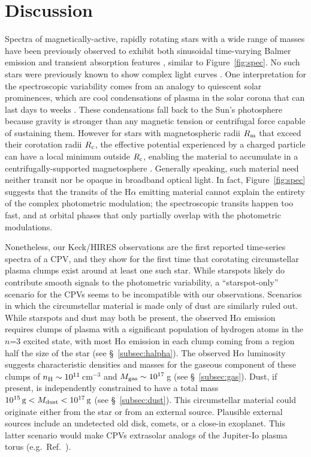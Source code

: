 \documentclass{nature3}
\begin{document}
\section{Discussion}

Spectra of magnetically-active, rapidly rotating stars with a wide
range of masses have been previously observed to exhibit both
sinusoidal time-varying Balmer emission
\cite{Donati2000,Townsend2005,Dunstone2006,Skelly2008} and transient
absorption features
\cite{CollierCameron1989,CollierCameron1992,Cang2020}, similar to
Figure~\ref{fig:spec}.  No such stars were previously known to show
complex light curves \cite{Bouma2024}.   One interpretation for the
spectroscopic variability comes from an analogy to quiescent solar
prominences, which are cool condensations of plasma in the solar
corona that can last days to weeks \cite{VialEngvold2015}.  These
condensations fall back to the Sun's photosphere because gravity is
stronger than any magnetic tension or centrifugal force capable of
sustaining them.  However for stars with magnetospheric radii $R_{\rm
m}$ that exceed their corotation radii $R_{\rm c}$, the effective
potential experienced by a charged particle can have a local minimum
outside $R_{\rm c}$, enabling the material to accumulate in a
centrifugally-supported magnetosphere
\cite{Petit2013,Daley-Yates2024}.  Generally speaking, such material
need neither transit nor be opaque in broadband optical light.  In
fact, Figure~\ref{fig:spec} suggests that the transits of the
H$\alpha$ emitting material cannot explain the entirety of the complex
photometric modulation;  the spectroscopic transits happen too fast,
and at orbital phases that only partially overlap with the photometric
modulations.

Nonetheless, our Keck/HIRES observations are the first reported
time-series spectra of a CPV, and they show for the first time that
corotating circumstellar plasma clumps exist around at least one such
star.  While starspots likely do contribute smooth signals to the
photometric variability, a ``starspot-only'' scenario for the CPVs
\cite{Koen2021} seems to be incompatible with our observations.
Scenarios in which the circumstellar material is made only of dust are
similarly ruled out.  While starspots and dust may both be present,
the observed H$\alpha$ emission requires clumps of plasma with a
significant population of hydrogen atoms in the $n$=3 excited state,
with most H$\alpha$ emission in each clump coming from a region half
the size of the star (see \S~\ref{subsec:halpha}).  The observed
H$\alpha$ luminosity suggests characteristic densities and masses for
the gaseous component of these clumps of $n_{\rm H} \sim
10^{11}$\,cm$^{-3}$ and $M_{\rm gas} \sim 10^{17}$\,g (see
\S~\ref{subsec:gas}).  Dust, if present, is independently constrained
to have a total mass $10^{15}\,{\rm g} < M_{\rm dust} < 10^{17}\,{\rm
g}$ (see \S~\ref{subsec:dust}).  This circumstellar material could
originate either from the star or from an external source.  Plausible
external sources include an undetected old disk, comets, or a close-in
exoplanet.  This latter scenario would make CPVs extrasolar analogs of
the Jupiter-Io plasma torus (e.g.~Ref.~\cite{Bagenal1981}).
\end{document}
